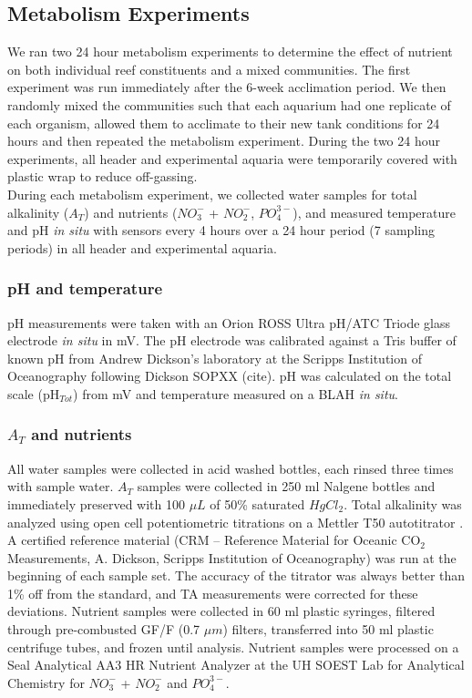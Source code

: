 \documentclass[]{rsos}%
\begin{document}
\subsection{Metabolism Experiments}
We ran two 24 hour metabolism experiments to determine the effect of nutrient on both individual reef constituents and a mixed communities. The first experiment was run immediately after the 6-week acclimation period. We then randomly mixed the communities such that each aquarium had one replicate of each organism, allowed them to acclimate to their new tank conditions for 24 hours and then repeated the metabolism experiment. During the two 24 hour experiments, all header and experimental aquaria were temporarily covered with plastic wrap to reduce off-gassing.\\
\indent During each metabolism experiment, we collected water samples for total alkalinity ($A_{T}$) and nutrients ($NO_{3}^{-}$ + $NO_{2}^{-}$, $PO_{4}^{3-}$), and measured temperature and pH \textit{in situ} with sensors every 4 hours over a 24 hour period (7 sampling periods) in all header and experimental aquaria.  
  
\subsubsection{pH and temperature}
pH measurements were taken with an Orion ROSS Ultra pH/ATC Triode glass electrode \textit{in situ} in mV. The pH electrode was calibrated against a Tris buffer of known pH from Andrew Dickson's laboratory at the Scripps Institution of Oceanography following Dickson SOPXX (cite). pH was calculated on the total scale (pH$_{Tot}$) from mV and temperature measured on a BLAH \textit{in situ}. 
\subsubsection{$A_{T}$ and nutrients}
All water samples were collected in acid washed bottles, each rinsed three times with sample water.  $A_{T}$ samples were collected in 250 ml Nalgene bottles and immediately preserved with 100 $\mu L$ of 50\% saturated $HgCl_{2}$. Total alkalinity was analyzed using open cell potentiometric titrations on a Mettler T50 autotitrator \cite{Dickson2007}. A certified reference material (CRM -- Reference Material for Oceanic CO$_2$ Measurements, A. Dickson, Scripps Institution of Oceanography) was run at the beginning of each sample set. The accuracy of the titrator was always better than 1\% off from the standard, and TA measurements were corrected for these deviations. Nutrient samples were collected in 60 ml plastic syringes, filtered through pre-combusted GF/F (0.7 $\mu m$) filters, transferred into 50 ml plastic centrifuge tubes, and frozen until analysis. Nutrient samples were processed on a Seal Analytical AA3 HR Nutrient Analyzer at the UH SOEST Lab for Analytical Chemistry for $NO_{3}^{-}$ + $NO_{2}^{-}$ and $PO_{4}^{3-}$.  
\end{document}
